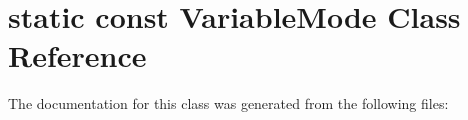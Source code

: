 \hypertarget{classstatic_01const_01VariableMode}{}\section{static const Variable\+Mode Class Reference}
\label{classstatic_01const_01VariableMode}


The documentation for this class was generated from the following files\+: